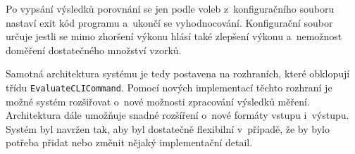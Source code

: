 Po vypsání výsledků porovnání se jen podle voleb z~konfiguračního souboru nastaví exit kód programu a~ukončí se vyhodnocování.
Konfigurační soubor určuje jestli se mimo zhoršení výkonu hlásí také zlepšení výkonu a~nemožnost doměření dostatečného množství vzorků.

Samotná architektura systému je tedy postavena na rozhraních, které obklopují třídu \lstinline|EvaluateCLICommand|.
Pomocí nových implementací těchto rozhraní je možné systém rozšiřovat o~nové možnosti zpracování výsledků měření.
Architektura dále umožňuje snadné rozšíření o~nové formáty vstupu i~výstupu. Systém byl navržen tak, aby byl dostatečně
flexibilní v~případě, že by bylo potřeba přidat nebo změnit nějaký implementační detail.

